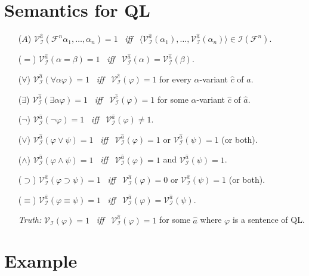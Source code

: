 \documentclass[a4paper, 11pt]{article} %
\newcommand{\tuple}[1]{\langle#1\rangle} %
\newcommand{\I}{\mathcal{I}}
\newcommand{\F}{\mathcal{F}}
\newcommand{\VV}[2]{\mathcal{V}_{#1}^{#2}} %
\begin{document}
\section*{Semantics for QL}

\begin{enumerate}
  \item[($A$)] $\VV{\I}{\hat{a}}(\F^n\alpha_1,\ldots,\alpha_n)=1$ ~\textit{iff}~ $\tuple{\VV{\I}{\hat{a}}{(\alpha_1)},\ldots,\VV{\I}{\hat{a}}{(\alpha_n)}}\in\I(\F^n)$.
  \item[($=$)] $\VV{\I}{\hat{a}}(\alpha=\beta)=1$ ~\textit{iff}~ $\VV{\I}{\hat{a}}(\alpha)=\VV{\I}{\hat{a}}(\beta)$.
  \item[(\hspace{1pt}$\forall$\hspace{1pt})] $\VV{\I}{\hat{a}}(\forall\alpha\varphi)=1$ ~\textit{iff}~ $\VV{\I}{\hat{c}}(\varphi)=1$ for every $\alpha$-variant $\hat{c}$ of $\hat{a}$.
  \item[(\hspace{1pt}$\exists$\hspace{1pt})] $\VV{\I}{\hat{a}}(\exists\alpha\varphi)=1$ ~\textit{iff}~ $\VV{\I}{\hat{c}}(\varphi)=1$ for some $\alpha$-variant $\hat{c}$ of $\hat{a}$.
  \item[($\neg$)] $\VV{\I}{\hat{a}}(\neg\varphi)=1$ ~\textit{iff}~ $\VV{\I}{\hat{a}}(\varphi)\neq 1$.
  \item[($\vee$)] $\VV{\I}{\hat{a}}(\varphi \vee \psi)=1$ ~\textit{iff}~ $\VV{\I}{\hat{a}}(\varphi)=1$ or $\VV{\I}{\hat{a}}(\psi)=1$ (or both).
  \item[($\wedge$)] $\VV{\I}{\hat{a}}(\varphi \wedge \psi)=1$ ~\textit{iff}~ $\VV{\I}{\hat{a}}(\varphi)=1$ and $\VV{\I}{\hat{a}}(\psi)=1$.
  \item[($\supset$)] $\VV{\I}{\hat{a}}(\varphi \supset \psi)=1$ ~\textit{iff}~ $\VV{\I}{\hat{a}}(\varphi)=0$ or $\VV{\I}{\hat{a}}(\psi)=1$ (or both).
  \item[($\equiv$)] $\VV{\I}{\hat{a}}(\varphi \equiv \psi)=1$ ~\textit{iff}~ $\VV{\I}{\hat{a}}(\varphi)=\VV{\I}{\hat{a}}(\psi)$.
    \vspace{.1in}
  \item[\it Truth:] $\VV{\I}{}(\varphi)=1$ ~\textit{iff}~ $\VV{\I}{\hat{a}}(\varphi)=1$ for some $\hat{a}$ where $\varphi$ is a sentence of QL. 
\end{enumerate}




\section*{Example}
\end{document}
